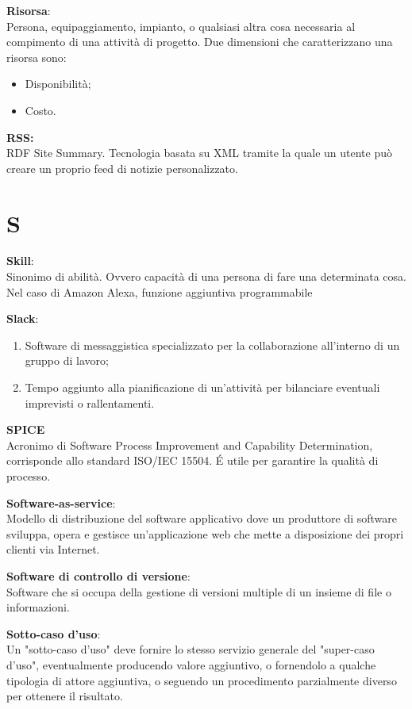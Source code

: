 \documentclass[a4paper, oneside, openany, dvipsnames, table]{article}
\begin{document}
\textbf{Risorsa}:\\	Persona, equipaggiamento, impianto, o qualsiasi altra cosa necessaria al compimento di una attività di progetto. Due dimensioni che caratterizzano una risorsa sono:
\begin{itemize}
\item Disponibilità;
\item Costo.
\end{itemize} 

\textbf{RSS:}\\
RDF Site Summary. Tecnologia basata su XML tramite la quale un utente può creare un proprio feed di notizie personalizzato.

\newpage
\section{S}
\textbf{Skill}:\\	Sinonimo di abilità. Ovvero capacità di una persona di fare una determinata cosa. Nel caso di Amazon Alexa, funzione aggiuntiva programmabile

\textbf{Slack}:
\begin{enumerate}
	\item Software di messaggistica specializzato per la collaborazione all'interno di un gruppo di lavoro;
	\item Tempo aggiunto alla pianificazione di un'attività per bilanciare eventuali imprevisti o rallentamenti.
\end{enumerate} 

\textbf{SPICE}\\
Acronimo di Software Process Improvement and Capability Determination, corrisponde allo standard ISO/IEC 15504. \'E utile per garantire la qualità di processo.

\textbf{Software-as-service}:\\	Modello di distribuzione del software applicativo dove un produttore di software sviluppa, opera e gestisce un'applicazione web che mette a disposizione dei propri clienti via Internet.

\textbf{Software di controllo di versione}:\\ Software che si occupa della  gestione di versioni multiple di un insieme di file o informazioni.

\textbf{Sotto-caso d'uso}:\\
Un "sotto-caso d'uso" deve fornire lo stesso servizio generale del "super-caso d'uso", eventualmente producendo valore aggiuntivo, o fornendolo a qualche tipologia di attore aggiuntiva, o seguendo un procedimento parzialmente diverso per ottenere il risultato.
\end{document}

